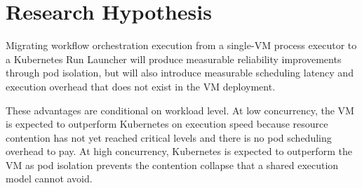 
\section{Research Hypothesis}
\label{sec:hypothesis}

Migrating workflow orchestration execution from a single-VM process executor to a Kubernetes Run Launcher will produce measurable reliability improvements through pod isolation, but will also introduce measurable scheduling latency and execution overhead that does not exist in the VM deployment.

These advantages are conditional on workload level. At low concurrency, the VM is expected to outperform Kubernetes on execution speed because resource contention has not yet reached critical levels and there is no pod scheduling overhead to pay. At high concurrency, Kubernetes is expected to outperform the VM as pod isolation prevents the contention collapse that a shared execution model cannot avoid.
